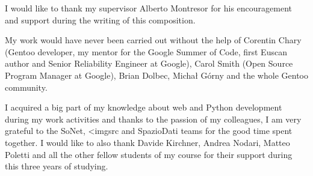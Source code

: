 
I would like to thank my supervisor Alberto Montresor for his encouragement and support during the writing of this composition.

My work would have never been carried out without the help of Corentin Chary (Gentoo developer, my mentor for the Google Summer of Code, first Euscan author and Senior Reliability Engineer at Google), Carol Smith (Open Source Program Manager at Google), Brian Dolbec, Michał Górny and the whole Gentoo community.

I acquired a big part of my knowledge about web and Python development during my work activities and thanks to the passion of my colleagues, I am very grateful to the SoNet, <imgsrc and SpazioDati teams for the good time spent together.
I would like to also thank Davide Kirchner, Andrea Nodari, Matteo Poletti and all the other fellow students of my course for their support during this three years of studying.